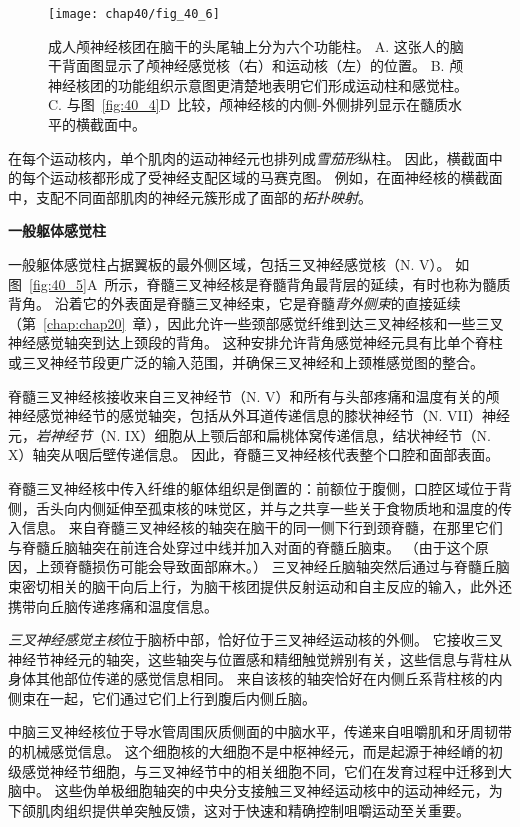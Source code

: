 \begin{figure}[htbp]
	\centering
	\texttt{[image: chap40/fig\_40\_6]}
	\caption{成人颅神经核团在脑干的头尾轴上分为六个功能柱。
		A. 这张人的脑干背面图显示了颅神经感觉核（右）和运动核（左）的位置。
		B. 颅神经核团的功能组织示意图更清楚地表明它们形成运动柱和感觉柱。
		C. 与图~\ref{fig:40_4}D~比较，颅神经核的内侧-外侧排列显示在髓质水平的横截面中。}
	\label{fig:40_6}
\end{figure}


在每个运动核内，单个肌肉的运动神经元也排列成\textit{雪茄形}纵柱。
因此，横截面中的每个运动核都形成了受神经支配区域的马赛克图。
例如，在面神经核的横截面中，支配不同面部肌肉的神经元簇形成了面部的\textit{拓扑映射}。


\textbf{一般躯体感觉柱}

一般躯体感觉柱占据翼板的最外侧区域，包括三叉神经感觉核（N. V）。
如图~\ref{fig:40_5}A~所示，脊髓三叉神经核是脊髓背角最背层的延续，有时也称为髓质背角。
沿着它的外表面是脊髓三叉神经束，它是脊髓\textit{背外侧束}的直接延续（第~\ref{chap:chap20}~章），因此允许一些颈部感觉纤维到达三叉神经核和一些三叉神经感觉轴突到达上颈段的背角。
这种安排允许背角感觉神经元具有比单个脊柱或三叉神经节段更广泛的输入范围，并确保三叉神经和上颈椎感觉图的整合。


脊髓三叉神经核接收来自三叉神经节（N. V）和所有与头部疼痛和温度有关的颅神经感觉神经节的感觉轴突，包括从外耳道传递信息的膝状神经节（N. VII）神经元，\textit{岩神经节}（N. IX）细胞从上颚后部和扁桃体窝传递信息，结状神经节（N. X）轴突从咽后壁传递信息。
因此，脊髓三叉神经核代表整个口腔和面部表面。


脊髓三叉神经核中传入纤维的躯体组织是倒置的：前额位于腹侧，口腔区域位于背侧，舌头向内侧延伸至孤束核的味觉区，并与之共享一些关于食物质地和温度的传入信息。
来自脊髓三叉神经核的轴突在脑干的同一侧下行到颈脊髓，在那里它们与脊髓丘脑轴突在前连合处穿过中线并加入对面的脊髓丘脑束。
（由于这个原因，上颈脊髓损伤可能会导致面部麻木。）
三叉神经丘脑轴突然后通过与脊髓丘脑束密切相关的脑干向后上行，为脑干核团提供反射运动和自主反应的输入，此外还携带向丘脑传递疼痛和温度信息。


\textit{三叉神经感觉主核}位于脑桥中部，恰好位于三叉神经运动核的外侧。
它接收三叉神经节神经元的轴突，这些轴突与位置感和精细触觉辨别有关，这些信息与背柱从身体其他部位传递的感觉信息相同。
来自该核的轴突恰好在内侧丘系背柱核的内侧束在一起，它们通过它们上行到腹后内侧丘脑。


中脑三叉神经核位于导水管周围灰质侧面的中脑水平，传递来自咀嚼肌和牙周韧带的机械感觉信息。
这个细胞核的大细胞不是中枢神经元，而是起源于神经嵴的初级感觉神经节细胞，与三叉神经节中的相关细胞不同，它们在发育过程中迁移到大脑中。
这些伪单极细胞轴突的中央分支接触三叉神经运动核中的运动神经元，为下颌肌肉组织提供单突触反馈，这对于快速和精确控制咀嚼运动至关重要。


